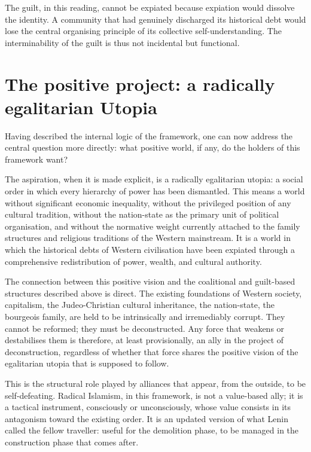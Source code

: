 \documentclass[12pt,a4paper]{article}
\begin{document}
	The guilt, in this reading, cannot be expiated because expiation would dissolve the
	identity. A community that had genuinely discharged its historical debt would lose
	the central organising principle of its collective self-understanding. The
	interminability of the guilt is thus not incidental but functional.
	
	\section{The positive project: a radically egalitarian Utopia}
	
	Having described the internal logic of the framework, one can now address the
	central question more directly: what positive world, if any, do the holders of this
	framework want?
	
	The aspiration, when it is made explicit, is a radically egalitarian utopia: a
	social order in which every hierarchy of power has been dismantled. This means a
	world without significant economic inequality, without the privileged position of
	any cultural tradition, without the nation-state as the primary unit of political
	organisation, and without the normative weight currently attached to the family
	structures and religious traditions of the Western mainstream. It is a world in
	which the historical debts of Western civilisation have been expiated through a
	comprehensive redistribution of power, wealth, and cultural authority.
	
	The connection between this positive vision and the coalitional and guilt-based
	structures described above is direct. The existing foundations of Western
	society, capitalism, the Judeo-Christian cultural inheritance, the nation-state,
	the bourgeois family, are held to be intrinsically and irremediably corrupt. They
	cannot be reformed; they must be deconstructed. Any force that weakens or
	destabilises them is therefore, at least provisionally, an ally in the project of
	deconstruction, regardless of whether that force shares the positive vision of the
	egalitarian utopia that is supposed to follow.
	
	This is the structural role played by alliances that appear, from the outside, to be
	self-defeating. Radical Islamism, in this framework, is not a value-based ally; it
	is a tactical instrument, consciously or unconsciously, whose value consists in
	its antagonism toward the existing order. It is an updated version of what Lenin
	called the fellow traveller: useful for the demolition phase, to be managed in the
	construction phase that comes after.
	
\end{document}
